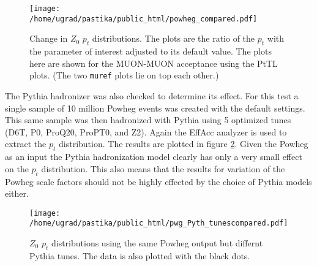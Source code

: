 \documentclass{article}
\begin{document}
\begin{figure}[t]
	\begin{center}
		\texttt{[image: /home/ugrad/pastika/public\_html/powheg\_compared.pdf]}
		\caption{Change in $Z_{0}$ $p_{t}$ distributions.  The plots are the ratio of the $p_{t}$ with the parameter of interest adjusted to its default value. The plots here are shown for the MUON-MUON acceptance using the PtTL plots.  (The two {\tt muref} plots lie on top each other.)}
		\label{p1}
    \end{center}
\end{figure}

The Pythia hadronizer was also checked to determine its effect.  For this test a single sample of 10 million Powheg events was created with the default settings.  This same sample was then hadronized with Pythia using 5 optimized tunes (D6T, P0, ProQ20, ProPT0, and Z2).  Again the EffAcc analyzer is used to extract the $p_{t}$ distribution.  The results are plotted in figure \ref{p2}.  Given the Powheg as an input the Pythia hadronization model clearly has only a very small effect on the $p_{t}$ distribution.  This also means that the results for variation of the Powheg scale factors should not be highly effected by the choice of Pythia models either.  

\begin{figure}[b]
	\begin{center}
		\texttt{[image: /home/ugrad/pastika/public\_html/pwg\_Pyth\_tunescompared.pdf]}
		\caption{$Z_{0}$ $p_{t}$ distributions using the same Powheg output but differnt Pythia tunes.  The data is also plotted with the black dots.}
		\label{p2}
    \end{center}
\end{figure}
\end{document}
